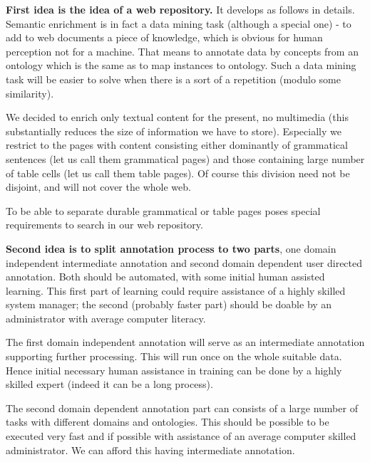 \documentclass{sig-alternate}
\begin{document}
\textbf{First idea is the idea of a web repository.} It develops as follows in details. Semantic enrichment is in fact a data mining task (although a special one) - to add to web documents a piece of knowledge, which is obvious for human perception not for a machine. That means to annotate data by concepts from an ontology which is the same as to map instances to ontology. Such a data mining task will be easier to solve when there is a sort of a repetition (modulo some similarity).\par 
We decided to enrich only textual content for the present, no multimedia (this substantially reduces the size of information we have to store). Especially we restrict to the pages with content consisting either dominantly of grammatical sentences (let us call them grammatical pages) and those containing large number of table cells (let us call them table pages). Of course this division need not be disjoint, and will not cover the whole web.\par
To be able to separate durable grammatical or table pages poses special requirements to search in our web repository.\par

\textbf{Second idea is to split annotation process to two parts}, one domain independent intermediate annotation and second domain dependent user directed annotation. Both should be automated, with some initial human assisted learning. This first part of learning could require assistance of a highly skilled system manager; the second (probably faster part) should be doable by an administrator with average computer literacy. \par

The first domain independent annotation will serve as an intermediate annotation supporting further processing. This will run once on the whole suitable data. Hence initial necessary human assistance in training can be done by a highly skilled expert (indeed it can be a long process).\par
The second domain dependent annotation part can consists of a large number of tasks with different domains and ontologies. This should be possible to be executed very fast and if possible with assistance of an average computer skilled administrator.  We can afford this having intermediate annotation. \par
\end{document}
